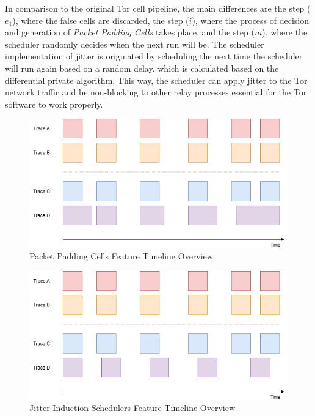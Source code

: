 In comparison to the original Tor cell pipeline, the main differences are the step (\(e_1\)), where the false cells are discarded, the step (\(i\)), where the process of decision and generation of \textit{Packet Padding Cells} takes place, and the step (\(m\)), where the scheduler randomly decides when the next run will be. The scheduler implementation of jitter is originated by scheduling the next time the scheduler will run again based on a random delay, which is calculated based on the differential private algorithm. This way, the scheduler can apply jitter to the Tor network traffic and be non-blocking to other relay processes essential for the Tor software to work properly. 

\begin{figure}[!h]
  \centering
  \includegraphics[width=\textwidth]{Chapters/Figures/PPC_Timeline.png}
  \caption{Packet Padding Cells Feature Timeline Overview}\label{fig:ppc_timeline}
\end{figure}

\begin{figure}[!h]
  \centering
  \includegraphics[width=\textwidth]{Chapters/Figures/JIS_Timeline.png}
  \caption{Jitter Induction Schedulers Feature Timeline Overview}\label{fig:jis_timeline}
\end{figure}

